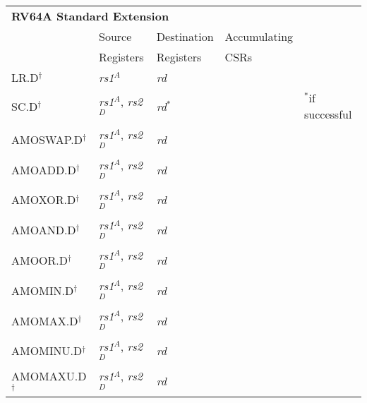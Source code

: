 \begin{tabular}{p{3cm}|p{25mm}|p{3cm}|p{4cm}|p{4cm}}
  \multicolumn{4}{l}{\bf RV64A Standard Extension} \\
  \cline{2-4}
   & Source    & Destination & Accumulating \\
   & Registers & Registers   & CSRs \\
  \cline{2-4}
   LR.D$^\dagger$ & {\em rs1}$^A$ & {\em rd} &   & \\
   \cline{2-4}
   SC.D$^\dagger$ & {\em rs1}$^A$, {\em rs2}$^D$ & {\em rd}$^*$ & & $^*$if successful  \\
   \cline{2-4}
   AMOSWAP.D$^\dagger$ & {\em rs1}$^A$, {\em rs2}$^D$ & {\em rd} &   & \\
   \cline{2-4}
   AMOADD.D$^\dagger$ & {\em rs1}$^A$, {\em rs2}$^D$ & {\em rd} &   & \\
   \cline{2-4}
   AMOXOR.D$^\dagger$ & {\em rs1}$^A$, {\em rs2}$^D$ & {\em rd} &   & \\
   \cline{2-4}
   AMOAND.D$^\dagger$ & {\em rs1}$^A$, {\em rs2}$^D$ & {\em rd} &   & \\
   \cline{2-4}
   AMOOR.D$^\dagger$ & {\em rs1}$^A$, {\em rs2}$^D$ & {\em rd} &   & \\
   \cline{2-4}
   AMOMIN.D$^\dagger$ & {\em rs1}$^A$, {\em rs2}$^D$ & {\em rd} &   & \\
   \cline{2-4}
   AMOMAX.D$^\dagger$ & {\em rs1}$^A$, {\em rs2}$^D$ & {\em rd} &   & \\
   \cline{2-4}
   AMOMINU.D$^\dagger$ & {\em rs1}$^A$, {\em rs2}$^D$ & {\em rd} &   & \\
   \cline{2-4}
   AMOMAXU.D$^\dagger$ & {\em rs1}$^A$, {\em rs2}$^D$ & {\em rd} &   & \\
   \cline{2-4}
\end{tabular}

